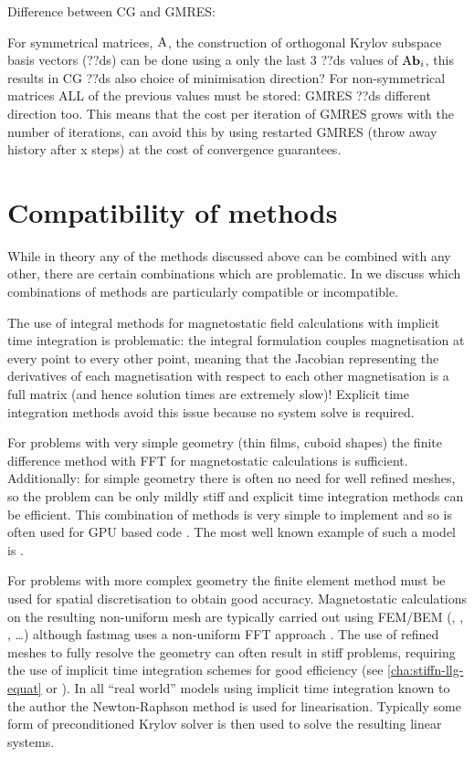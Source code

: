 Difference between CG and GMRES:

For symmetrical matrices, $\mathrm{A}$, the construction of orthogonal Krylov subspace basis vectors (??ds) can be done using a only the last 3 ??ds values of $\mathrm{A} {\boldsymbol{\mathrm{b}}}_i$, this results in CG ??ds also choice of minimisation direction?
For non-symmetrical matrices ALL of the previous values must be stored: GMRES ??ds different direction too.
This means that the cost per iteration of GMRES grows with the number of iterations, can avoid this by using restarted GMRES (throw away history after x steps) at the cost of convergence guarantees.


\section{Compatibility of methods}
\label{sec:comp-meth}

While in theory any of the methods discussed above can be combined with any other, there are certain combinations which are problematic.
In  we discuss which combinations of methods are particularly compatible or incompatible.

The use of integral methods for magnetostatic field calculations with implicit time integration is problematic: the integral formulation couples magnetisation at every point to every other point, meaning that the Jacobian representing the derivatives of each magnetisation with respect to each other magnetisation is a full matrix (and hence solution times are extremely slow)!
Explicit time integration methods avoid this issue because no system solve is required.

For problems with very simple geometry (\ie thin films, cuboid shapes) the finite difference method with FFT for magnetostatic calculations is sufficient.
Additionally: for simple geometry there is often no need for well refined meshes, so the problem can be only mildly stiff and explicit time integration methods can be efficient.
This combination of methods is very simple to implement and so is often used for GPU based code \cite{Vansteenkiste2011}.
The most well known example of such a model is \oommf \cite{oommf-website}.

For problems with more complex geometry the finite element method must be used for spatial discretisation to obtain good accuracy.
Magnetostatic calculations on the resulting non-uniform mesh are typically carried out using FEM/BEM (\nmag \cite{Fischbacher2007}, \magpar \cite{Scholz2003}, \femme, \ldots) although fastmag uses a non-uniform FFT approach \cite{Chang2011}.
The use of refined meshes to fully resolve the geometry can often result in stiff problems, requiring the use of implicit time integration schemes for good efficiency (see \cref{cha:stiffn-llg-equat} or \cite{Shepherd2014}).
In all ``real world'' models using implicit time integration known to the author the Newton-Raphson method is used for linearisation.
Typically some form of preconditioned Krylov solver is then used to solve the resulting linear systems.



